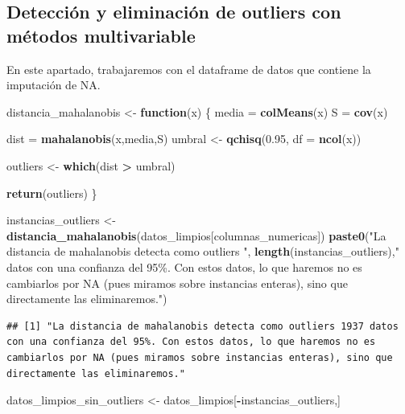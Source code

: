 \documentclass[notspecified,article,submit,moreauthors,pdftex]{Definitions/mdpi}
\newenvironment{Shaded}{\begin{snugshade}}{\end{snugshade}}
\newcommand{\AttributeTok}[1]{\textcolor[rgb]{0.13,0.29,0.53}{#1}}
\newcommand{\ControlFlowTok}[1]{\textcolor[rgb]{0.13,0.29,0.53}{\textbf{#1}}}
\newcommand{\FloatTok}[1]{\textcolor[rgb]{0.00,0.00,0.81}{#1}}
\newcommand{\FunctionTok}[1]{\textcolor[rgb]{0.13,0.29,0.53}{\textbf{#1}}}
\newcommand{\NormalTok}[1]{#1}
\newcommand{\OtherTok}[1]{\textcolor[rgb]{0.56,0.35,0.01}{#1}}
\newcommand{\SpecialCharTok}[1]{\textcolor[rgb]{0.81,0.36,0.00}{\textbf{#1}}}
\newcommand{\StringTok}[1]{\textcolor[rgb]{0.31,0.60,0.02}{#1}}
\begin{document}
\hypertarget{detecciuxf3n-y-eliminaciuxf3n-de-outliers-con-muxe9todos-multivariable}{%
\subsection{Detección y eliminación de outliers con métodos
multivariable}\label{detecciuxf3n-y-eliminaciuxf3n-de-outliers-con-muxe9todos-multivariable}}

En este apartado, trabajaremos con el dataframe de datos que contiene la
imputación de NA.

\begin{Shaded}
\begin{Highlighting}[]
\NormalTok{distancia\_mahalanobis }\OtherTok{\textless{}{-}} \ControlFlowTok{function}\NormalTok{(x) \{}
\NormalTok{  media }\OtherTok{=} \FunctionTok{colMeans}\NormalTok{(x)}
\NormalTok{  S }\OtherTok{=} \FunctionTok{cov}\NormalTok{(x)}
  
\NormalTok{  dist }\OtherTok{=} \FunctionTok{mahalanobis}\NormalTok{(x,media,S)}
\NormalTok{  umbral }\OtherTok{\textless{}{-}} \FunctionTok{qchisq}\NormalTok{(}\FloatTok{0.95}\NormalTok{, }\AttributeTok{df =} \FunctionTok{ncol}\NormalTok{(x))}

\NormalTok{  outliers }\OtherTok{\textless{}{-}} \FunctionTok{which}\NormalTok{(dist }\SpecialCharTok{\textgreater{}}\NormalTok{ umbral)}
  
  \FunctionTok{return}\NormalTok{(outliers)}
\NormalTok{\}}

\NormalTok{instancias\_outliers }\OtherTok{\textless{}{-}} \FunctionTok{distancia\_mahalanobis}\NormalTok{(datos\_limpios[columnas\_numericas])}
\FunctionTok{paste0}\NormalTok{(}\StringTok{"La distancia de mahalanobis detecta como outliers "}\NormalTok{, }\FunctionTok{length}\NormalTok{(instancias\_outliers),}\StringTok{" datos con una confianza del 95\%. Con estos datos, lo que haremos no es cambiarlos por NA (pues miramos sobre instancias enteras), sino que directamente las eliminaremos."}\NormalTok{)}
\end{Highlighting}
\end{Shaded}

\begin{verbatim}
## [1] "La distancia de mahalanobis detecta como outliers 1937 datos con una confianza del 95%. Con estos datos, lo que haremos no es cambiarlos por NA (pues miramos sobre instancias enteras), sino que directamente las eliminaremos."
\end{verbatim}

\begin{Shaded}
\begin{Highlighting}[]
\NormalTok{datos\_limpios\_sin\_outliers }\OtherTok{\textless{}{-}}\NormalTok{ datos\_limpios[}\SpecialCharTok{{-}}\NormalTok{instancias\_outliers,]}
\end{Highlighting}
\end{Shaded}
\end{document}
